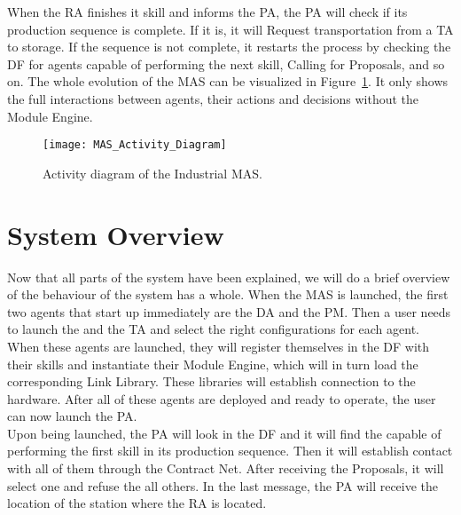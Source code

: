 When the \acrshort{RA} finishes it skill and informs the \acrshort{PA}, the \acrshort{PA} will check if its production sequence is complete. If it is, it will Request transportation from a \acrshort{TA} to storage. If the sequence is not complete, it restarts the process by checking the \acrshort{DF} for agents capable of performing the next skill, Calling for Proposals, and so on. The whole evolution of the \acrshort{MAS} can be visualized in Figure~\ref{fig:mas_activity_diagram}. It only shows the full interactions between agents, their actions and decisions without the Module Engine.\\

\begin{figure}[H]
	\centering
	\texttt{[image: MAS\_Activity\_Diagram]}
	\caption{Activity diagram of the Industrial \acrlong{MAS}.}
	\label{fig:mas_activity_diagram}
\end{figure}

\section{System Overview}
\label{sec:system_overview}

Now that all parts of the system have been explained, we will do a brief overview of the behaviour of the system has a whole. When the \acrshort{MAS} is launched, the first two agents that start up immediately are the \acrlong{DA} and the \acrlong{PM}. Then a user needs to launch the  and the \acrlong{TA} and select the right configurations for each agent.\\ 

When these agents are launched, they will register themselves in the \acrshort{DF} with their skills and instantiate their Module Engine, which will in turn load the corresponding Link Library. These libraries will establish connection to the hardware. After all of these agents are deployed and ready to operate, the user can now launch the \acrlong{PA}.\\

Upon being launched, the \acrshort{PA} will look in the \acrshort{DF} and it will find the  capable of performing the first skill in its production sequence. Then it will establish contact with all of them through the Contract Net. After receiving the Proposals, it will select one and refuse the all others. In the last message, the \acrshort{PA} will receive the location of the station where the \acrshort{RA} is located.\\

